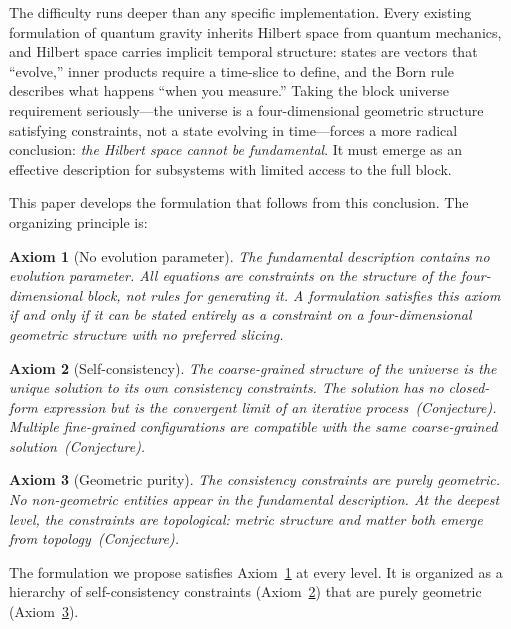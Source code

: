 \documentclass[12pt,a4paper]{article}
\newtheorem{axiom}{Axiom}
\theoremstyle{definition}
\theoremstyle{remark}
\begin{document}
The difficulty runs deeper than any specific implementation. Every existing
formulation of quantum gravity inherits Hilbert space from quantum mechanics,
and Hilbert space carries implicit temporal structure: states are vectors that
``evolve,'' inner products require a time-slice to define, and the Born rule
describes what happens ``when you measure.'' Taking the block universe
requirement seriously---the universe is a four-dimensional geometric structure
satisfying constraints, not a state evolving in time---forces a more radical
conclusion: \emph{the Hilbert space cannot be fundamental}. It must emerge as
an effective description for subsystems with limited access to the full block.

This paper develops the formulation that follows from this conclusion. The
organizing principle is:

\begin{axiom}[No evolution parameter]
\label{ax:timeless}
The fundamental description contains no evolution parameter. All equations
are constraints on the structure of the four-dimensional block, not rules for
generating it. A formulation satisfies this axiom if and only if it can be
stated entirely as a constraint on a four-dimensional geometric structure with
no preferred slicing.
\end{axiom}

\begin{axiom}[Self-consistency]
\label{ax:selfconsistency}
The coarse-grained structure of the universe is the unique solution to its
own consistency constraints. The solution has no closed-form expression but
is the convergent limit of an iterative process~(Conjecture). Multiple
fine-grained configurations are compatible with the same coarse-grained
solution~(Conjecture).
\end{axiom}

\begin{axiom}[Geometric purity]
\label{ax:geometric}
The consistency constraints are purely geometric. No non-geometric entities
appear in the fundamental description. At the deepest level, the constraints
are topological: metric structure and matter both emerge from topology~(Conjecture).
\end{axiom}

The formulation we propose satisfies Axiom~\ref{ax:timeless} at every level.
It is organized as a hierarchy of self-consistency constraints
(Axiom~\ref{ax:selfconsistency}) that are purely geometric
(Axiom~\ref{ax:geometric}).

\medskip
\end{document}
